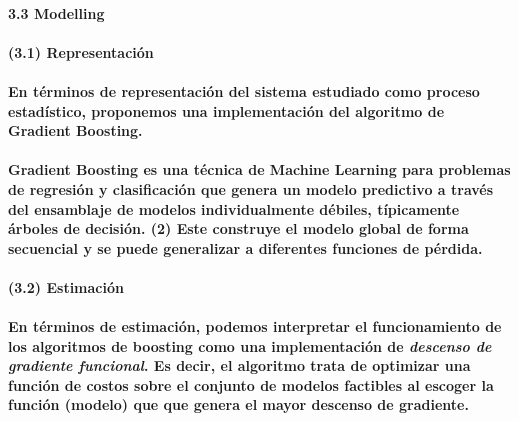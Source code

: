\documentclass[]{article}
\let\oldparagraph\paragraph
\renewcommand{\paragraph}[1]{\oldparagraph{#1}\mbox{}}
\begin{document}
\paragraph{3.3 Modelling}\label{modelling}

\paragraph{(3.1) Representación}\label{representacion}

\paragraph{En términos de representación del sistema estudiado como
proceso estadístico, proponemos una implementación del algoritmo de
Gradient
Boosting.}\label{en-terminos-de-representacion-del-sistema-estudiado-como-proceso-estadistico-proponemos-una-implementacion-del-algoritmo-de-gradient-boosting.}

\paragraph{Gradient Boosting es una técnica de Machine Learning para
problemas de regresión y clasificación que genera un modelo predictivo a
través del ensamblaje de modelos individualmente débiles, típicamente
árboles de decisión. (2) Este construye el modelo global de forma
secuencial y se puede generalizar a diferentes funciones de
pérdida.}\label{gradient-boosting-es-una-tecnica-de-machine-learning-para-problemas-de-regresion-y-clasificacion-que-genera-un-modelo-predictivo-a-traves-del-ensamblaje-de-modelos-individualmente-debiles-tipicamente-arboles-de-decision.-2-este-construye-el-modelo-global-de-forma-secuencial-y-se-puede-generalizar-a-diferentes-funciones-de-perdida.}

\paragraph{(3.2) Estimación}\label{estimacion}

\paragraph{\texorpdfstring{En términos de estimación, podemos
interpretar el funcionamiento de los algoritmos de boosting como una
implementación de \emph{descenso de gradiente funcional}. Es decir, el
algoritmo trata de optimizar una función de costos sobre el conjunto de
modelos factibles al escoger la función (modelo) que que genera el mayor
descenso de
gradiente.}{En términos de estimación, podemos interpretar el funcionamiento de los algoritmos de boosting como una implementación de descenso de gradiente funcional. Es decir, el algoritmo trata de optimizar una función de costos sobre el conjunto de modelos factibles al escoger la función (modelo) que que genera el mayor descenso de gradiente.}}\label{en-terminos-de-estimacion-podemos-interpretar-el-funcionamiento-de-los-algoritmos-de-boosting-como-una-implementacion-de-descenso-de-gradiente-funcional.-es-decir-el-algoritmo-trata-de-optimizar-una-funcion-de-costos-sobre-el-conjunto-de-modelos-factibles-al-escoger-la-funcion-modelo-que-que-genera-el-mayor-descenso-de-gradiente.}
\end{document}

